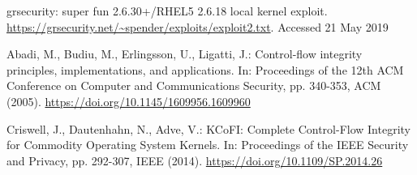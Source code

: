 \documentclass[english,sigrecommended,JIP]{ipsj}
\begin{document}
\begin{thebibliography}{99}
  grsecurity: super fun 2.6.30+/RHEL5 2.6.18 local kernel exploit. \url{https://grsecurity.net/~spender/exploits/exploit2.txt}. Accessed 21 May 2019  


  Abadi, M., Budiu, M., Erlingsson, U., Ligatti, J.: Control-flow integrity principles, implementations, and applications. In: Proceedings of the 12th ACM Conference on Computer and Communications Security, pp. 340-353, ACM (2005). \url{https://doi.org/10.1145/1609956.1609960}

  Criswell, J., Dautenhahn, N., Adve, V.: KCoFI: Complete Control-Flow Integrity for Commodity Operating System Kernels. In: Proceedings of the IEEE Security and Privacy, pp. 292-307, IEEE (2014).  \url{https://doi.org/10.1109/SP.2014.26}


\end{thebibliography}
\end{document}
